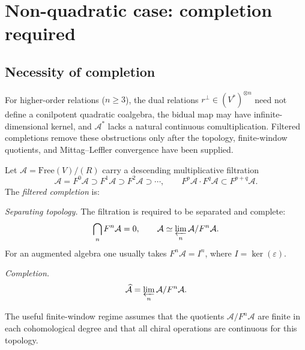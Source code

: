 \section{Non-quadratic case: completion required}
\label{sec:non-quadratic-existence}

\subsection{Necessity of completion}

\begin{remark}\label{rem:non-quadratic-obstructions}
For higher-order relations ($n \ge 3$), the dual relations
$r^\perp \in (V^*)^{\otimes n}$ need not define a conilpotent
quadratic coalgebra, the bidual map may have infinite-dimensional
kernel, and $\mathcal{A}^*$ lacks a natural continuous
comultiplication. Filtered completions remove these obstructions only
after the topology, finite-window quotients, and
Mittag--Leffler convergence have been supplied.
\end{remark}

\begin{definition}\label{def:filtered-completion}
Let $\mathcal{A} = \text{Free}(V) / (R)$ carry a descending
multiplicative filtration
\[
\mathcal A=F^0\mathcal A \supset F^1\mathcal A \supset
F^2\mathcal A\supset\cdots,\qquad
F^p\mathcal A\cdot F^q\mathcal A\subset F^{p+q}\mathcal A .
\]
The \emph{filtered completion} is:

\emph{Separating topology.}
The filtration is required to be separated and complete:
\[
\bigcap_nF^n\mathcal A=0,\qquad
\mathcal A\simeq\varprojlim_n\mathcal A/F^n\mathcal A .
\]
For an augmented algebra one usually takes $F^n\mathcal A=I^n$,
where $I=\ker(\varepsilon)$.

\emph{Completion.}
\[\widehat{\mathcal{A}} = \varprojlim_n \mathcal{A} / F^n\mathcal{A}.\]

The useful finite-window regime assumes that the quotients
$\mathcal A/F^n\mathcal A$ are finite in each cohomological degree and
that all chiral operations are continuous for this topology.
\end{definition}


